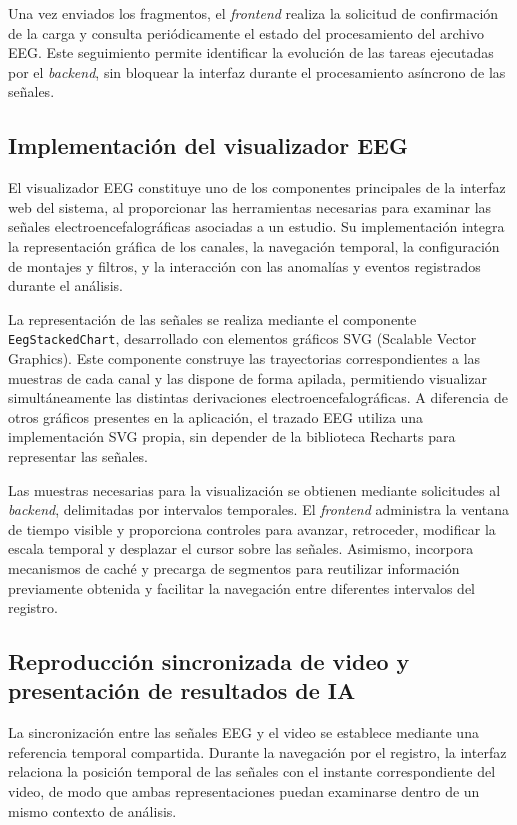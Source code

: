 Una vez enviados los fragmentos, el \textit{frontend}
realiza la solicitud de confirmación de la
carga y consulta periódicamente el estado
del procesamiento del archivo EEG. Este
seguimiento permite identificar la evolución
de las tareas ejecutadas por el \textit{backend},
sin bloquear la interfaz durante el
procesamiento asíncrono de las señales.

\subsection{Implementación del visualizador EEG}

El visualizador EEG constituye uno de los
componentes principales de la interfaz web
del sistema, al proporcionar las herramientas
necesarias para examinar las señales
electroencefalográficas asociadas a un estudio.
Su implementación integra la representación
gráfica de los canales, la navegación temporal,
la configuración de montajes y filtros, y
la interacción con las anomalías y eventos
registrados durante el análisis.

La representación de las señales se realiza
mediante el componente \texttt{EegStackedChart},
desarrollado con elementos gráficos SVG
(Scalable Vector Graphics). Este componente
construye las trayectorias correspondientes
a las muestras de cada canal y las dispone
de forma apilada, permitiendo visualizar
simultáneamente las distintas derivaciones
electroencefalográficas. A diferencia de
otros gráficos presentes en la aplicación,
el trazado EEG utiliza una implementación
SVG propia, sin depender de la biblioteca
Recharts para representar las señales.

Las muestras necesarias para la visualización
se obtienen mediante solicitudes al \textit{backend},
delimitadas por intervalos temporales.
El \textit{frontend} administra la ventana de tiempo
visible y proporciona controles para avanzar,
retroceder, modificar la escala temporal
y desplazar el cursor sobre las señales.
Asimismo, incorpora mecanismos de caché
y precarga de segmentos para reutilizar
información previamente obtenida y facilitar
la navegación entre diferentes intervalos
del registro.

\subsection{Reproducción sincronizada de video y presentación de resultados de IA}

La sincronización entre las señales
EEG y el video se establece mediante
una referencia temporal compartida.
Durante la navegación por el registro,
la interfaz relaciona la posición
temporal de las señales con el instante
correspondiente del video, de modo
que ambas representaciones puedan
examinarse dentro de un mismo contexto
de análisis.

